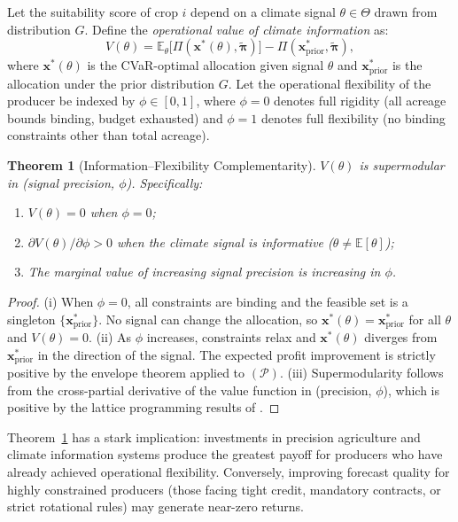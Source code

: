 \documentclass[12pt,review,authoryear]{elsarticle}
\numberwithin{equation}{section}
\newtheorem{theorem}{Theorem}[section]
\begin{document}
Let the suitability score of crop $i$ depend on a climate signal
$\theta \in \Theta$ drawn from distribution $G$.  Define the
\emph{operational value of climate information} as:
\begin{equation}
V(\theta) = \mathbb{E}_\theta \bigl[ \Pi(\mathbf{x}^*(\theta), \tilde{\boldsymbol{\pi}})\bigr] - \Pi(\mathbf{x}^*_{\text{prior}}, \tilde{\boldsymbol{\pi}}),
\label{eq:voi}
\end{equation}
where $\mathbf{x}^*(\theta)$ is the CVaR-optimal allocation given signal
$\theta$ and $\mathbf{x}^*_{\text{prior}}$ is the allocation under the
prior distribution $G$.  Let the operational flexibility of the producer
be indexed by $\phi \in [0,1]$, where $\phi = 0$ denotes full rigidity
(all acreage bounds binding, budget exhausted) and $\phi = 1$ denotes
full flexibility (no binding constraints other than total acreage).

\begin{theorem}[Information--Flexibility Complementarity]
\label{thm:ifc}
$V(\theta)$ is supermodular in (signal precision, $\phi$).  Specifically:
\begin{enumerate}
\item[(i)] $V(\theta) = 0$ when $\phi = 0$;
\item[(ii)] $\partial V(\theta) / \partial \phi > 0$ when the climate
signal is informative ($\theta \neq \mathbb{E}[\theta]$);
\item[(iii)] The marginal value of increasing signal precision is
increasing in $\phi$.
\end{enumerate}
\end{theorem}

\begin{proof}
(i) When $\phi = 0$, all constraints are binding and the feasible set is
a singleton $\{\mathbf{x}^*_{\text{prior}}\}$.  No signal can change the
allocation, so $\mathbf{x}^*(\theta) = \mathbf{x}^*_{\text{prior}}$ for
all $\theta$ and $V(\theta) = 0$.  (ii) As $\phi$ increases, constraints
relax and $\mathbf{x}^*(\theta)$ diverges from $\mathbf{x}^*_{\text{prior}}$
in the direction of the signal.  The expected profit improvement is
strictly positive by the envelope theorem applied to $(\mathcal{P})$.
(iii) Supermodularity follows from the cross-partial derivative of the
value function in (precision, $\phi$), which is positive by the lattice
programming results of \citet{Topkis1998}.
\end{proof}

Theorem~\ref{thm:ifc} has a stark implication: investments in precision
agriculture and climate information systems produce the greatest payoff
for producers who have already achieved operational flexibility.
Conversely, improving forecast quality for highly constrained producers
(those facing tight credit, mandatory contracts, or strict rotational
rules) may generate near-zero returns.
\end{document}
